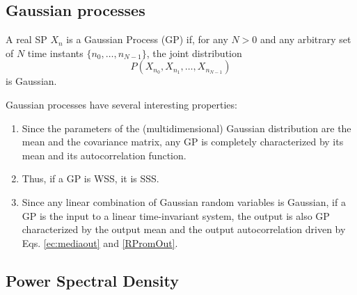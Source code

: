 \subsection{Gaussian processes}
\label{sec:snr}

\begin{definition}
A real SP $X_n$ is a Gaussian Process (GP) if, for any $N>0$ and any arbitrary set of $N$ time instants $\{n_0,\ldots, n_{N-1}\}$, the joint distribution 
\begin{equation}
P(X_{n_0},X_{n_1},\ldots, X_{n_{N-1}})
\end{equation}
is Gaussian.
\end{definition}

Gaussian processes have several interesting properties:
\begin{enumerate}
\item Since the parameters of the (multidimensional) Gaussian distribution are the mean and the covariance matrix, any GP is completely characterized by its mean and its autocorrelation function.
\item Thus, if a GP is WSS, it is SSS.
\item Since any linear combination of Gaussian random variables is Gaussian, if a GP is the input to a linear time-invariant system, the output is also GP characterized by the output mean and the output autocorrelation driven by Eqs. \eqref{ec:mediaout} and \eqref{RPromOut}.
\end{enumerate}

%

\subsection{Power Spectral Density}
\label{sec:PowerSpectralDensity}

